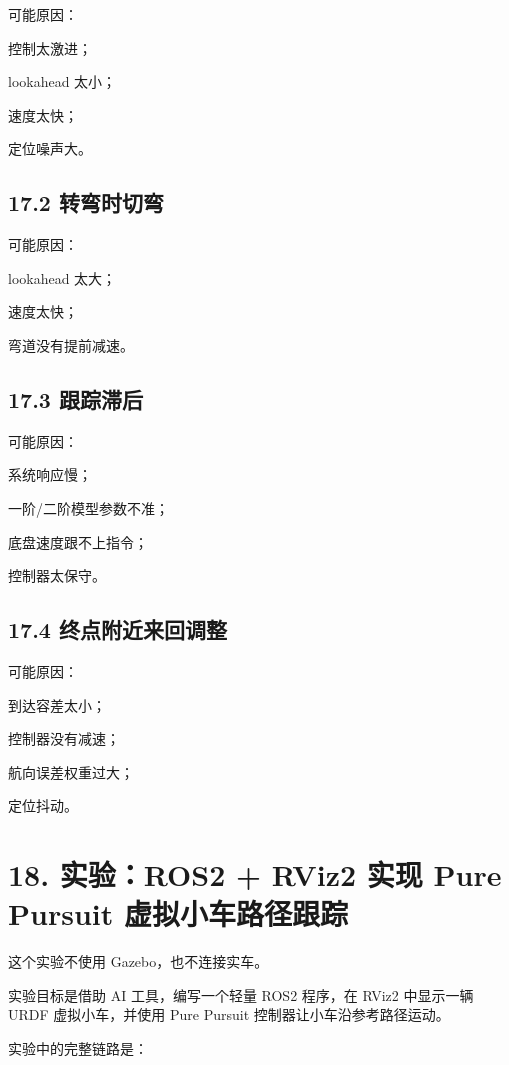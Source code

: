 \documentclass[a4paper,12pt]{book}
\begin{document}
{可能原因：

\item 控制太激进；
\item lookahead 太小；
\item 速度太快；
\item 定位噪声大。

\subsection{17.2 转弯时切弯}

可能原因：

\item lookahead 太大；
\item 速度太快；
\item 弯道没有提前减速。

\subsection{17.3 跟踪滞后}

可能原因：

\item 系统响应慢；
\item 一阶/二阶模型参数不准；
\item 底盘速度跟不上指令；
\item 控制器太保守。

\subsection{17.4 终点附近来回调整}

可能原因：

\item 到达容差太小；
\item 控制器没有减速；
\item 航向误差权重过大；
\item 定位抖动。

\hrulefill

\section{18. 实验：ROS2 + RViz2 实现 Pure Pursuit 虚拟小车路径跟踪}

这个实验不使用 Gazebo，也不连接实车。

实验目标是借助 AI 工具，编写一个轻量 ROS2 程序，在 RViz2 中显示一辆 URDF 虚拟小车，并使用 Pure Pursuit 控制器让小车沿参考路径运动。

实验中的完整链路是：

}
\end{document}
